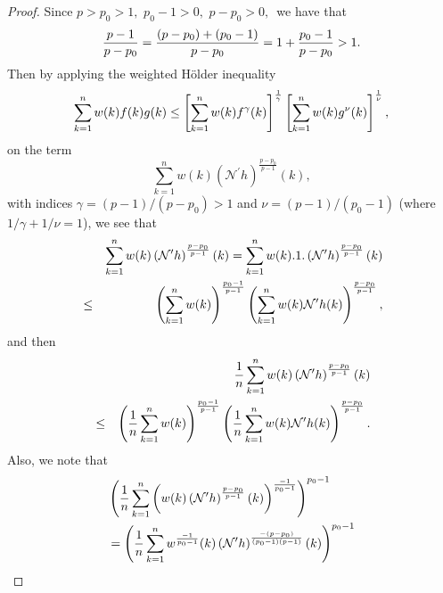 \documentclass[a4paper]{amsart}
\theoremstyle{plain}
\numberwithin{equation}{section}
\begin{document}
\begin{proof}
Since $p>p_{0}>1,$ $p_{0}-1>0,$ $p-p_{0}>0,$\ we have that 
\begin{equation}
\frac{p-1}{p-p_{0}}=\frac{\left( p-p_{0}\right) +\left( p_{0}-1\right) }{%
p-p_{0}}=1+\frac{p_{0}-1}{p-p_{0}}>1.  \label{c16}
\end{equation}%
Then by applying the weighted H\"{o}lder inequality 
\begin{equation}
\sum\limits_{k=1}^{n}w(k)f(k)g(k)\leq \left[ \sum\limits_{k=1}^{n}w(k)f^{%
\gamma }(k)\right] ^{\frac{1}{\gamma }}\left[ \sum\limits_{k=1}^{n}w(k)g^{%
\nu }(k)\right] ^{\frac{1}{\nu }},  \label{wh}
\end{equation}%
on the term 
\begin{equation*}
\sum\limits_{k=1}^{n}w(k)\left( \mathcal{N}^{\prime }h\right) ^{\frac{p-p_{0}%
}{p-1}}(k),
\end{equation*}%
with indices $\gamma =\left( p-1\right) /\left( p-p_{0}\right) >1$ and $\nu
=\left( p-1\right) /\left( p_{0}-1\right) $ (where $1/\gamma +1/\nu =1$), we
see that%
\begin{eqnarray*}
&&\sum\limits_{k=1}^{n}w(k)\left( \mathcal{N}^{\prime }h\right) ^{\frac{%
p-p_{0}}{p-1}}(k)=\sum\limits_{k=1}^{n}w(k).1.\left( \mathcal{N}^{\prime
}h\right) ^{\frac{p-p_{0}}{p-1}}(k) \\
&\leq &\left( \sum\limits_{k=1}^{n}w(k)\right) ^{\frac{p_{0}-1}{p-1}}\left(
\sum\limits_{k=1}^{n}w(k)\mathcal{N}^{\prime }h(k)\right) ^{\frac{p-p_{0}}{%
p-1}},
\end{eqnarray*}%
and then 
\begin{eqnarray}
&&\frac{1}{n}\sum\limits_{k=1}^{n}w(k)\left( \mathcal{N}^{\prime }h\right) ^{%
\frac{p-p_{0}}{p-1}}(k)  \notag \\
&\leq &\left( \frac{1}{n}\sum\limits_{k=1}^{n}w(k)\right) ^{\frac{p_{0}-1}{%
p-1}}\left( \frac{1}{n}\sum\limits_{k=1}^{n}w(k)\mathcal{N}^{\prime
}h(k)\right) ^{\frac{p-p_{0}}{p-1}}.  \label{c17}
\end{eqnarray}%
Also, we note that%
\begin{align}
& \left( \frac{1}{n}\sum\limits_{k=1}^{n}\left( w(k)\left( \mathcal{N}%
^{\prime }h\right) ^{\frac{p-p_{0}}{p-1}}(k)\right) ^{\frac{-1}{p_{0}-1}%
}\right) ^{p_{0}-1}  \notag \\
& =\left( \frac{1}{n}\sum\limits_{k=1}^{n}w^{\frac{-1}{p_{0}-1}}(k)\left( 
\mathcal{N}^{\prime }h\right) ^{\frac{-\left( p-p_{0}\right) }{\left(
p_{0}-1\right) \left( p-1\right) }}(k)\right) ^{p_{0}-1}  \notag \\

\end{align}
\end{proof}
\end{document}

